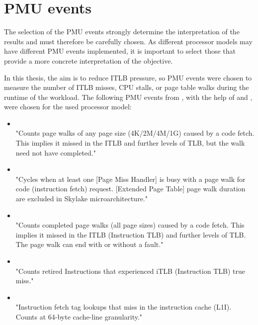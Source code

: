 \section{PMU events}\label{section:events}

The selection of the PMU events strongly determine the interpretation of the results and must therefore be carefully chosen. As different processor models may have different PMU events implemented, it is important to select those that provide a more concrete interpretation of the objective.

In this thesis, the aim is to reduce ITLB pressure, so PMU events were chosen to measure the number of ITLB misses, CPU stalls, or page table walks during the runtime of the workload. The following PMU events from \cite{skylake_events}, with the help of  \cite[p. 266]{brendan} and \cite{propeller}, were chosen for the used processor model:

\begin{itemize}
    \item {}\\
    "Counts page walks of any page size (4K/2M/4M/1G) caused by a code fetch. This implies it missed in the ITLB and further levels of TLB, but the walk need not have completed." \cite{skylake_events}
    \item {}\\
    "Cycles when at least one [Page Miss Handler] is busy with a page walk for code (instruction fetch) request. [Extended Page Table] page walk duration are excluded in Skylake microarchitecture." \cite{skylake_events}
    \item {}\\
    "Counts completed page walks (all page sizes) caused by a code fetch. This implies it missed in the ITLB (Instruction TLB) and further levels of TLB. The page walk can end with or without a fault." \cite{skylake_events}
    \item {}\\
    "Counts retired Instructions that experienced iTLB (Instruction TLB) true miss." \cite{skylake_events}
    \item {}\\
    "Instruction fetch tag lookups that miss in the instruction cache (L1I). Counts at 64-byte cache-line granularity." \cite{skylake_events}
\end{itemize}

